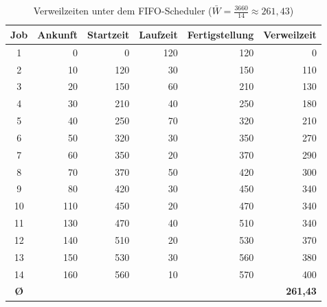 \begin{table}[H]
  \centering
  \begin{tabular}{|c|r|r|r|r|r|}
    \hline
    \textbf{Job} & \textbf{Ankunft} & \textbf{Startzeit} & \textbf{Laufzeit} & \textbf{Fertigstellung} & \textbf{Verweilzeit} \\
    \hline
    1  &   0 &   0 & 120 & 120 &   0 \\
    2  &  10 & 120 &  30 & 150 & 110 \\
    3  &  20 & 150 &  60 & 210 & 130 \\
    4  &  30 & 210 &  40 & 250 & 180 \\
    5  &  40 & 250 &  70 & 320 & 210 \\
    6  &  50 & 320 &  30 & 350 & 270 \\
    7  &  60 & 350 &  20 & 370 & 290 \\
    8  &  70 & 370 &  50 & 420 & 300 \\
    9  &  80 & 420 &  30 & 450 & 340 \\
    10 & 110 & 450 &  20 & 470 & 340 \\
    11 & 130 & 470 &  40 & 510 & 340 \\
    12 & 140 & 510 &  20 & 530 & 370 \\
    13 & 150 & 530 &  30 & 560 & 380 \\
    14 & 160 & 560 &  10 & 570 & 400 \\
    \hline
    \textbf{Ø} & & & & & \textbf{261,43} \\
    \hline
  \end{tabular}
  \caption{Verweilzeiten unter dem FIFO-Scheduler ($\bar{W} = \tfrac{3660}{14} \approx 261{,}43$)}
  \label{tab:fifoVerweilzeit}
\end{table}

